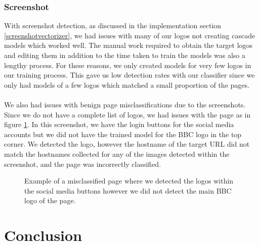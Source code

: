 \documentclass[12pt,twoside]{report}
\begin{document}
\subsection{Screenshot}
With screenshot detection, as discussed in the implementation section \ref{screenshotvectorizer}, we had issues with many of our logos not creating cascade models which worked well. The manual work required to obtain the target logos and editing them in addition to the time taken to train the models was also a lengthy process. For these reasons, we only created models for very few logos in our training process. This gave us low detection rates with our classifier since we only had models of a few logos which matched a small proportion of the pages.
\\\\
We also had issues with benign page misclassifications due to the screenshots. Since we do not have a complete list of logos, we had issues with the page as in figure \ref{fig:malicious196}. In this screenshot, we have the login buttons for the social media accounts but we did not have the trained model for the BBC logo in the top corner. We detected the logo, however the hostname of the target URL did not match the hostnames collected for any of the images detected within the screenshot, and the page was incorrectly classified.
\\
\begin{figure}[h]
  \begin{center}
  \end{center}
  \caption{Example of a misclassified page where we detected the logos within the social media buttons however we did not detect the main BBC logo of the page.}
  \label{fig:malicious196}
\end{figure}
\chapter{Conclusion}
\end{document}
